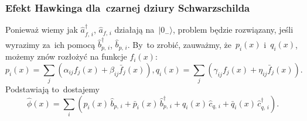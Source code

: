 \documentclass[10pt,t]{beamer}
\begin{document}
\begin{frame}
  \frametitle{Efekt Hawkinga dla~czarnej dziury Schwarzschilda}


  Ponieważ wiemy jak $\widehat{ a }_{ f,\, i }^{ \dagger }$,
  $\widehat{ a }_{ f,\, i }$ działają na~$| 0_{ - } \rangle$, problem
  będzie rozwiązany, jeśli wyrazimy za~ich pomocą
  $\widehat{ b }_{ p,\, i }^{ \dagger }$, $\widehat{ b }_{ p,\, i }$.
  By~to zrobić, zauważmy, że~$p_{ i }( x )$ i~$q_{ i }( x )$, możemy
  znów rozłożyć na funkcje $f_{ i }( x )$:
  \begin{subequations}
    \begin{equation}
      \label{eq:Promieniowanie-Hawkinga-42-A}
      p_{ i }( x ) =
      \sum_{ j }( \alpha_{ i j } f_{ j }( x ) + \beta_{ i j } \bar{ f }_{ j }( x ) ),
    \end{equation}
    \begin{equation}
      \label{eq:Promieniowanie-Hawkinga-42-B}
      q_{ i }( x ) =
      \sum_{ j }( \gamma_{ i j } f_{ j }( x ) + \eta_{ i j } \bar{ f }_{ j }( x ) ).
    \end{equation}
  \end{subequations}
  Podstawiają to~dostajemy
  \begin{equation}
    \label{eq:Promieniowanie-Hawkinga-43}
    \widehat{ \phi }( x ) =
    \sum_{ i }( p_{ i }( x )\, \widehat{ b }_{ p,\, i }
    + \bar{ p }_{ i }( x )\, \widehat{ b }^{ \dagger }_{ p,\, i }
    + q_{ i }( x )\, \widehat{ c }_{ q,\, i }
    + \bar{ q }_{ i }( x )\, \widehat{ c }^{ \dagger }_{ q,\, i } ).
  \end{equation}

\end{frame}
\end{document}
